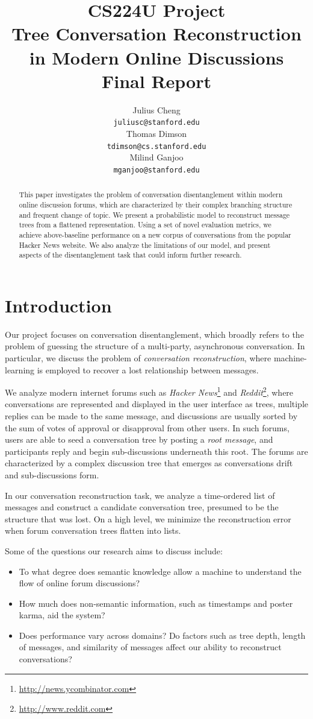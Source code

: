 \documentclass{article}
\title{{\small CS224U Project} \\ Tree Conversation Reconstruction in Modern Online Discussions \\ \small{Final Report}}
\author{Julius Cheng \\
  {\tt juliusc@stanford.edu}
  \\\And
  Thomas Dimson  \\
  {\tt tdimson@cs.stanford.edu}
  \\\AND
  Milind Ganjoo \\
  {\tt mganjoo@stanford.edu}
}
\date{}
\begin{document}
\maketitle
\begin{abstract}
This paper investigates the problem of conversation disentanglement within
modern online discussion forums, which are characterized by their complex
branching structure and frequent change of topic. We present a probabilistic
model to reconstruct message trees from a flattened representation. Using a
set of novel evaluation metrics, we achieve above-baseline performance on a
new corpus of conversations from the popular Hacker News website. We also
analyze the limitations of our model, and present aspects of the
disentanglement task that could inform further research.
\end{abstract}

\section{Introduction}
Our project focuses on conversation disentanglement, which broadly refers to
the problem of guessing the structure of a multi-party, asynchronous
conversation. In particular, we discuss the problem of \textit{conversation
reconstruction}, where machine-learning is employed to recover a lost
relationship between messages.

We analyze modern internet forums such as
\textit{Hacker News}\footnote{\url{http://news.ycombinator.com}} 
and \textit{Reddit}\footnote{\url{http://www.reddit.com}}, where conversations
are represented and displayed in the user interface as trees, multiple
replies can be made to the same message, and discussions are usually sorted by
the sum of votes of approval or disapproval from other users. In
such forums, users are able to seed a conversation tree by posting a
\textit{root message}, and participants reply and begin sub-discussions
underneath this root. The forums are characterized by a complex discussion
tree that emerges as conversations drift and sub-discussions form.

In our conversation reconstruction task, we analyze a time-ordered list of
messages and construct a candidate conversation tree, presumed to be the
structure that was lost. On a high level, we minimize the reconstruction error
when forum conversation trees flatten into lists.

Some of the questions our research aims to discuss include:
\begin{itemize}
  \item To what degree does semantic knowledge allow a machine to understand the 
    flow of online forum discussions?
  \item How much does non-semantic information, such as timestamps and poster karma,
    aid the system?
  \item Does performance vary across domains? Do factors such as tree depth,
    length of messages, and similarity of messages affect our ability to
    reconstruct conversations? 
\end{itemize}
\end{document}
